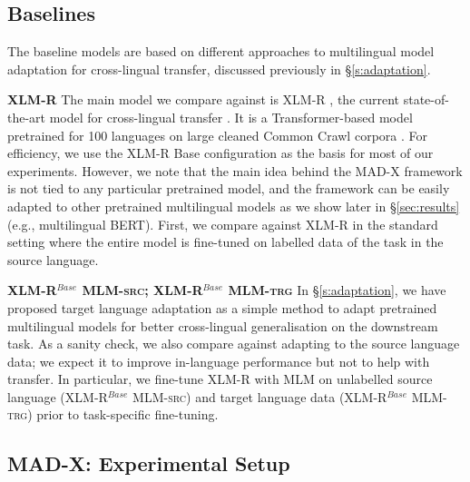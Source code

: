 \documentclass[11pt,a4paper]{article}
\newcommand{\model}[1]{\textsc{MAD-X}}
\newcommand{\xlmr}[1]{\textsc{XLM-R}}
\newcommand{\mlmsrc}[1]{\textsc{XLM-R$^{Base}$ MLM-src}}
\newcommand{\mlmtrg}[1]{\textsc{XLM-R$^{Base}$ MLM-trg}}
\begin{document}
\subsection{Baselines}
The baseline models are based on different approaches to multilingual model adaptation for cross-lingual transfer, discussed previously in \S\ref{s:adaptation}.

\vspace{1.8mm}
\noindent \textbf{\xlmr{}}\hspace{0.3mm}
The main model we compare against is XLM-R \cite{Conneau2020xlm-r}, the current state-of-the-art model for cross-lingual transfer \cite{Hu2020xtreme}. It is a Transformer-based model pretrained for 100 languages on large cleaned Common Crawl corpora \cite{Wenzek:2019arxiv}. For efficiency, we use the XLM-R Base configuration as the basis for most of our experiments. However, we note that the main idea behind the \model{} framework is not tied to any particular pretrained model, and the framework can be easily adapted to other pretrained multilingual models as we show later in \S\ref{sec:results} (e.g., multilingual BERT).
First, we compare against XLM-R in the standard setting where the entire model is fine-tuned on labelled data of the task in the source language. 



\vspace{1.8mm}
\noindent \textbf{\mlmsrc{}; \mlmtrg{}}\hspace{0.3mm} 
In \S\ref{s:adaptation}, we have proposed target language adaptation as a simple method to adapt pretrained multilingual models for better cross-lingual generalisation on the downstream task. As a sanity check, we also compare against adapting to the source language data; we expect it to improve in-language performance but not to help with transfer. In particular, we fine-tune XLM-R with MLM on unlabelled source language (\mlmsrc{}) and target language data (\mlmtrg{}) prior to task-specific fine-tuning. 

 

\subsection{ \model{}: Experimental Setup}
\end{document}
